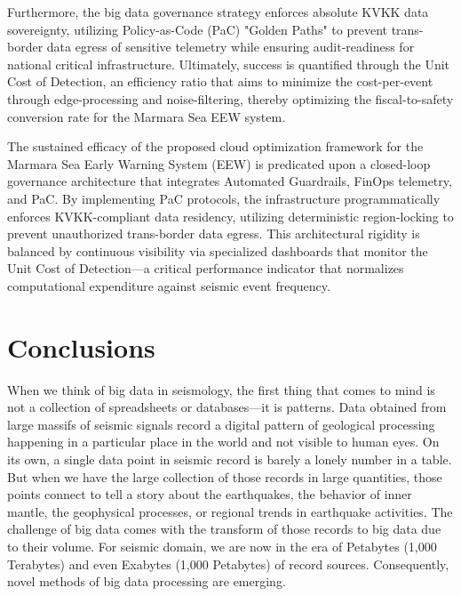 \documentclass[data,article,submit,pdftex,moreauthors]{Definitions/mdpi}
\begin{document}
Furthermore, the big data governance strategy enforces absolute KVKK data sovereignty, utilizing Policy-as-Code (PaC) "Golden Paths" to prevent trans-border data egress of sensitive telemetry while ensuring audit-readiness for national critical infrastructure. Ultimately, success is quantified through the Unit Cost of Detection, an efficiency ratio that aims to minimize the cost-per-event through edge-processing and noise-filtering, thereby optimizing the fiscal-to-safety conversion rate for the Marmara Sea EEW system.

The sustained efficacy of the proposed cloud optimization framework for the Marmara Sea Early Warning System (EEW) is predicated upon a closed-loop governance architecture that integrates Automated Guardrails, FinOps telemetry, and PaC. By implementing PaC protocols, the infrastructure programmatically enforces KVKK-compliant data residency, utilizing deterministic region-locking to prevent unauthorized trans-border data egress. This architectural rigidity is balanced by continuous visibility via specialized dashboards that monitor the Unit Cost of Detection—a critical performance indicator that normalizes computational expenditure against seismic event frequency.

\section{Conclusions}

When we think of big data in seismology, the first thing that comes to mind is not a collection of spreadsheets or databases—it is patterns. Data obtained from large massifs of seismic signals record a digital pattern of geological processing happening in a particular place in the world and not visible to human eyes. On its own, a single data point in seismic record is barely a lonely number in a table. But when we have the large collection of those records in large quantities, those points connect to tell a story about the earthquakes, the behavior of inner mantle, the geophysical processes, or regional trends in earthquake activities. The challenge of big data comes with the transform of those records to big data due to their volume. For seismic domain, we are now in the era of Petabytes (1,000 Terabytes) and even Exabytes (1,000 Petabytes) of record sources. Consequently, novel methods of big data processing are emerging. 
\end{document}
